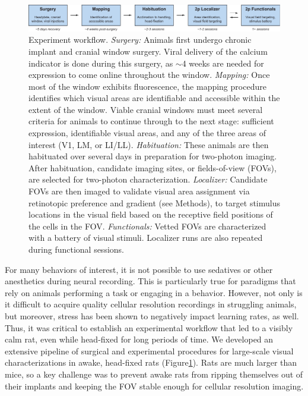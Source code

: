 \begin{figure}[t!]
    \includegraphics[width=\textwidth]{figures/chapter_2/fig_2-2_experiment_workflow/fig_2-2_experiment_workflow.pdf}
    \vspace{.1in}
    \caption[Experiment workflow]{Experiment workflow. 
    \textit{Surgery:} Animals first undergo chronic implant and cranial window surgery. Viral delivery of the calcium indicator is done during this surgery, as $\sim$4 weeks are needed for expression to come online throughout the window.
    \textit{Mapping:} Once most of the window exhibits fluorescence, the mapping procedure identifies which visual areas are identifiable and accessible within the extent of the window. Viable cranial windows must meet several criteria for animals to continue through to the next stage: sufficient expression, identifiable visual areas, and any of the three areas of interest (V1, LM, or LI/LL). \textit{Habituation:} These animals are then habituated over several days in preparation for two-photon imaging. After habituation, candidate imaging sites, or fields-of-view (FOVs), are selected for two-photon characterization. \textit{Localizer:} Candidate FOVs are then imaged to validate visual area assignment via retinotopic preference and gradient (see Methods), to target stimulus locations in the visual field based on the receptive field positions of the cells in the FOV. 
    \textit{Functionals:} Vetted FOVs are characterized with a battery of visual stimuli. Localizer runs are also repeated during functional sessions. 
    \label{fig:experiment_workflow}}
\end{figure}

For many behaviors of interest, it is not possible to use sedatives or other anesthetics during neural recording. This is particularly true for paradigms that rely on animals performing a task or engaging in a behavior. However, not only is it difficult to acquire quality cellular resolution recordings in struggling animals, but moreover, stress has been shown to negatively impact learning rates, as well\cite{REFREF}. Thus, it was critical to establish an experimental workflow that led to a visibly calm rat, even while head-fixed for long periods of time. We developed an extensive pipeline of surgical and experimental procedures for large-scale visual characterizations in awake, head-fixed rats (Figure\ref{fig:experiment_workflow}). Rats are much larger than mice, so a key challenge was to prevent awake rats from ripping themselves out of their implants and keeping the FOV stable enough for cellular resolution imaging. 

